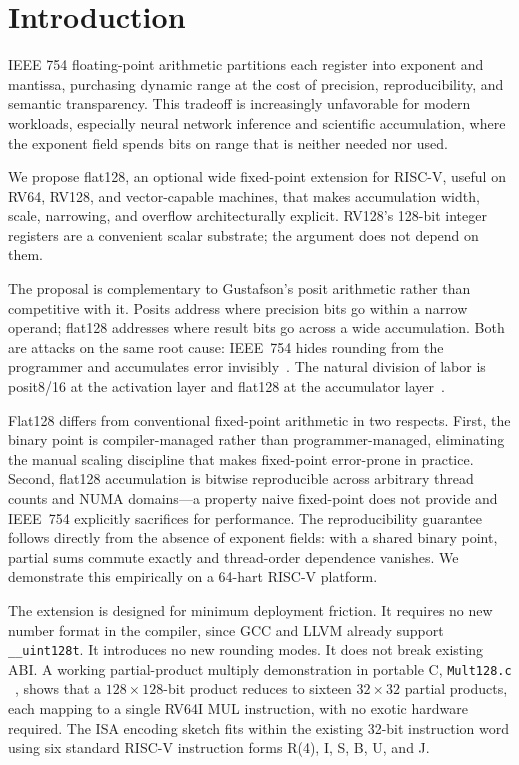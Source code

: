 \documentclass[runningheads]{llncs}
\begin{document}
\section{Introduction}\label{sec:intro}
IEEE 754 floating-point arithmetic partitions each register into exponent
and mantissa, purchasing dynamic range at the cost of precision,
reproducibility, and semantic transparency. This tradeoff is increasingly
unfavorable for modern workloads, especially neural network inference
and scientific accumulation, where the exponent field spends bits on
range that is neither needed nor used.

We propose flat128, an optional wide fixed-point extension for RISC-V,
useful on RV64, RV128, and vector-capable machines, that makes
accumulation width, scale, narrowing, and overflow architecturally
explicit. RV128's 128-bit integer registers are a convenient scalar
substrate; the argument does not depend on them.

The proposal is complementary to Gustafson's posit arithmetic rather
than competitive with it. Posits address where precision bits go within
a narrow operand; flat128 addresses where result bits go across a wide
accumulation. Both are attacks on the same root cause: IEEE~754 hides
rounding from the programmer and accumulates error invisibly~\cite{ieee2019standard}. The natural
division of labor is posit8/16 at the activation layer and flat128 at
the accumulator layer~\cite{gustafson2017beating,gustafson2017end}.

Flat128 differs from conventional fixed-point arithmetic in two respects. First, the binary point is compiler-managed rather than programmer-managed, eliminating the manual scaling discipline that makes fixed-point error-prone in practice. Second, flat128 accumulation is bitwise reproducible across arbitrary thread counts and NUMA domains---a property naive fixed-point does not provide and IEEE~754 explicitly sacrifices for performance. The reproducibility guarantee follows directly from the absence of exponent fields: with a shared binary point, partial sums commute exactly and thread-order dependence vanishes. We demonstrate this empirically on a 64-hart RISC-V platform.

The extension is designed for minimum deployment friction. It requires no
new number format in the compiler, since GCC and LLVM already support
\texttt{\_\_uint128\discretionary{}{}{\_}t}. It introduces no new rounding modes. It does not break existing ABI\@. A working partial-product multiply demonstration in portable C, \texttt{Mult128.c} ~\cite{sherman2026mult128},
shows that a $128\times128$-bit product reduces to sixteen $32\times32$
partial products, each mapping to a single RV64I MUL instruction, with
no exotic hardware required. The ISA encoding sketch fits within the
existing 32-bit instruction word using six standard RISC-V instruction
forms R(4), I, S, B, U, and J\@.
\end{document}
